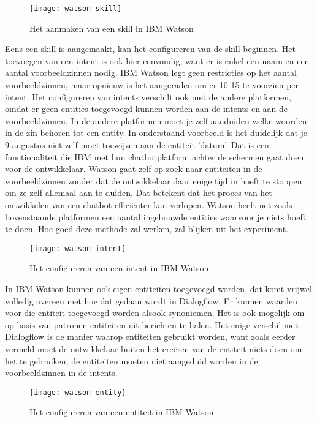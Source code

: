 \begin{figure}[H]
    \label{fig:watson-skill}
    \centering
    \texttt{[image: watson-skill]}
    \caption{Het aanmaken van een skill in IBM Watson}
\end{figure}

Eens een skill is aangemaakt, kan het configureren van de skill beginnen. Het toevoegen van een intent is ook hier eenvoudig, want er is enkel een naam en een aantal voorbeeldzinnen nodig. IBM Watson legt geen restricties op het aantal voorbeeldzinnen, maar opnieuw is het aangeraden om er 10-15 te voorzien per intent. Het configureren van intents verschilt ook met de andere platformen, omdat er geen entities toegevoegd kunnen worden aan de intents en aan de voorbeeldzinnen. In de andere platformen moet je zelf aanduiden welke woorden in de zin behoren tot een entity. In onderstaand voorbeeld is het duidelijk dat je 9 augustus niet zelf moet toewijzen aan de entiteit 'datum'. Dat is een functionaliteit die IBM met hun chatbotplatform achter de schermen gaat doen voor de ontwikkelaar. Watson gaat zelf op zoek naar entiteiten in de voorbeeldzinnen zonder dat de ontwikkelaar daar enige tijd in hoeft te stoppen om ze zelf allemaal aan te duiden. Dat betekent dat het proces van het ontwikkelen van een chatbot efficiënter kan verlopen. Watson heeft net zoals bovenstaande platformen een aantal ingebouwde entities waarvoor je niets hoeft te doen. Hoe goed deze methode zal werken, zal blijken uit het experiment.

\begin{figure}[H]
    \label{fig:watson-intent}
    \centering
    \texttt{[image: watson-intent]}
    \caption{Het configureren van een intent in IBM Watson}
\end{figure}

In IBM Watson kunnen ook eigen entiteiten toegevoegd worden, dat komt vrijwel volledig overeen met hoe dat gedaan wordt in Dialogflow. Er kunnen waarden voor die entiteit toegevoegd worden alsook synoniemen. Het is ook mogelijk om op basis van patronen entiteiten uit berichten te halen. Het enige verschil met Dialogflow is de manier waarop entiteiten gebruikt worden, want zoals eerder vermeld moet de ontwikkelaar buiten het creëren van de entiteit niets doen om het te gebruiken, de entiteiten moeten niet aangeduid worden in de voorbeeldzinnen in de intents.

\begin{figure}[H]
    \label{fig:watson-entity}
    \centering
    \texttt{[image: watson-entity]}
    \caption{Het configureren van een entiteit in IBM Watson}
\end{figure}


